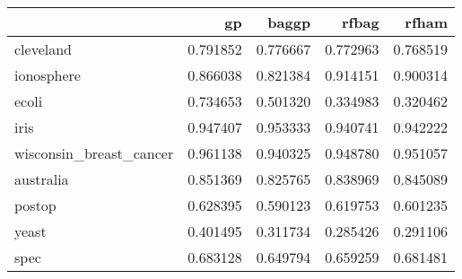 \begin{tabular}{lrrrr}
\toprule
{} &        gp &     baggp &     rfbag &     rfham \\
\midrule
cleveland               &  0.791852 &  0.776667 &  0.772963 &  0.768519 \\
ionosphere              &  0.866038 &  0.821384 &  0.914151 &  0.900314 \\
ecoli                   &  0.734653 &  0.501320 &  0.334983 &  0.320462 \\
iris                    &  0.947407 &  0.953333 &  0.940741 &  0.942222 \\
wisconsin\_breast\_cancer &  0.961138 &  0.940325 &  0.948780 &  0.951057 \\
australia               &  0.851369 &  0.825765 &  0.838969 &  0.845089 \\
postop                  &  0.628395 &  0.590123 &  0.619753 &  0.601235 \\
yeast                   &  0.401495 &  0.311734 &  0.285426 &  0.291106 \\
spec                    &  0.683128 &  0.649794 &  0.659259 &  0.681481 \\
\bottomrule
\end{tabular}
